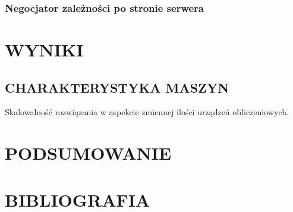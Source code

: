 \documentclass[12pt,a4paper,twoside]{article}
\begin{document}
\subsubsection{Negocjator zależności po stronie serwera}


\section{WYNIKI}

\subsection{CHARAKTERYSTYKA MASZYN}

Skalowalność rozwiązania w aspekcie zmiennej ilości urządzeń obliczeniowych.


\section{PODSUMOWANIE}


\newpage

\section{BIBLIOGRAFIA}
\end{document}
